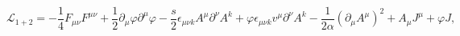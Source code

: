 \begin{equation}
\mathcal{L}_{1+2}=-\frac{1}{4}F_{\mu\nu}F^{\mu\nu}+\frac{1}{2}\partial_{\mu
}\varphi\partial^{\mu}\varphi-\frac{s}{2}\epsilon_{\mu\nu k}A^{\mu}%
\partial^{\nu}A^{k}+\varphi\epsilon_{\mu\nu k}v^{\mu}\partial^{\nu}A^{k}%
-\frac{1}{2\alpha}\left(  \partial_{\mu}A^{\mu}\right)  ^{2}+A_{\mu}J^{\mu
}+\varphi J, \label{Lagrange2}%
\end{equation}

